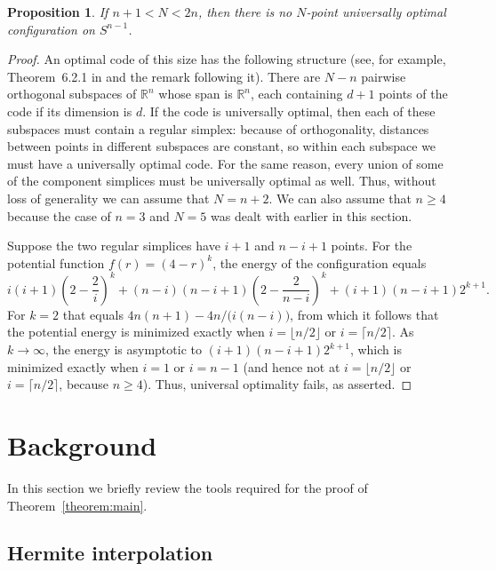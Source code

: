 \documentclass{jams-l}
\theoremstyle{plain}
\newtheorem{proposition}[theorem]{Proposition}
\numberwithin{theorem}{section}
\theoremstyle{definition}
\numberwithin{equation}{section}
\newcommand{\R}{{\mathbb R}}
\begin{document}
\begin{proposition}
If $n+1 < N < 2n$, then there is no $N$-point universally optimal
configuration on $S^{n-1}$.
\end{proposition}

\begin{proof}
An optimal code of this size has the following structure (see, for
example, Theorem~6.2.1 in \cite{BJr} and the remark following it).
There are $N-n$ pairwise orthogonal subspaces of $\R^n$ whose span
is $\R^n$, each containing $d+1$ points of the code if its
dimension is $d$. If the code is universally optimal, then each of
these subspaces must contain a regular simplex: because of
orthogonality, distances between points in different subspaces are
constant, so within each subspace we must have a universally
optimal code.  For the same reason, every union of some of the
component simplices must be universally optimal as well. Thus,
without loss of generality we can assume that $N=n+2$. We can also
assume that $n \ge 4$ because the case of $n=3$ and $N=5$ was
dealt with earlier in this section.

Suppose the two regular simplices have $i+1$ and $n-i+1$ points.
For the potential function $f(r) = (4-r)^k$, the energy of the
configuration equals
$$
i(i+1)\left(2-\frac{2}{i}\right)^k+
(n-i)(n-i+1)\left(2-\frac{2}{n-i}\right)^k+(i+1)(n-i+1)2^{k+1}.
$$
For $k=2$ that equals $4n(n+1)-4n/\big(i(n-i)\big)$, from which it
follows that the potential energy is minimized exactly when $i =
\lfloor n/2 \rfloor$ or $i = \lceil n/2 \rceil$.  As $k \to
\infty$, the energy is asymptotic to $(i+1)(n-i+1)2^{k+1}$, which
is minimized exactly when $i=1$ or $i=n-1$ (and hence not at $i =
\lfloor n/2 \rfloor$ or $i = \lceil n/2 \rceil$, because $n \ge
4$). Thus, universal optimality fails, as asserted.
\end{proof}

\section{Background}

In this section we briefly review the tools required for the proof
of Theorem~\ref{theorem:main}.

\subsection{Hermite interpolation}
\end{document}
